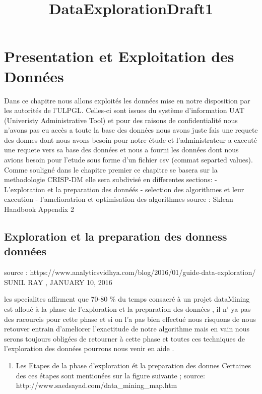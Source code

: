 \documentclass[11pt]{article}
\title{DataExplorationDraft1}
\providecommand{\tightlist}{%
      \setlength{\itemsep}{0pt}\setlength{\parskip}{0pt}}
\begin{document}
    
    
    \maketitle
    
    
    \section{Presentation et Exploitation des
Données}\label{presentation-et-exploitation-des-donnuxe9es}

    Dans ce chapitre nous allons exploités les données mise en notre
disposition par les autorités de l'ULPGL. Celles-ci sont issues du
système d'information UAT (Univeristy Administrative Tool) et pour des
raisons de confidentialité nous n'avons pas eu accès a toute la base des
données nous avons juste fais une requete des donnes dont nous avons
besoin pour notre étude et l'administrateur a executé une requete vers
sa base des données et nous a fourni les données dont nous avions besoin
pour l'etude sous forme d'un fichier csv (commat separted values). Comme
souligné dans le chapitre premier ce chapitre se basera sur la
methodologie CRISP-DM elle sera subdivisé en differentes sections: -
L'exploration et la preparation des donnéés - selection des algorithmes
et leur execution - l'amelioratrion et optimisation des algorithmes
source : Sklean Handbook Appendix 2

    \subsection{Exploration et la preparation des donness
données}\label{exploration-et-la-preparation-des-donness-donnuxe9es}

    source :
https://www.analyticsvidhya.com/blog/2016/01/guide-data-exploration/
SUNIL RAY , JANUARY 10, 2016

    les specialites affirment que 70-80 \% du temps consacré à un projet
dataMining est alloué à la phase de l'exploration et la preparation des
données , il n' ya pas des racourcis pour cette phase et si on l'a pas
bien effectué nous risquons de nous retouver entrain d'ameliorer
l'exactitude de notre algorithme mais en vain nous serons toujours
obligées de retourner à cette phase et toutes ces techniques de
l'exploration des données pourrons nous venir en aide .

    \begin{enumerate}
\def\labelenumi{\arabic{enumi}.}
\tightlist
\item
  Les Etapes de la phase d'exploration ét la preparation des donnes
  Certaines des ces étapes sont mentionées sur la figure suivante ;
  source: http://www.saedsayad.com/data\_mining\_map.htm
\end{enumerate}
\end{document}
